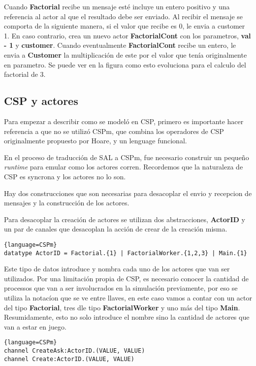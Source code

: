 \documentclass[fleqn]{article}
\begin{document}
Cuando \textbf{Factorial} recibe un mensaje esté incluye un entero positivo y
una referencia al actor al que el resultado debe ser enviado. Al recibir el
mensaje se comporta de la siguiente manera, si el valor que recibe es 0, le
envia a customer 1. En caso contrario, crea un nuevo actor
\textbf{FactorialCont} con los parametros, \textbf{val - 1} y \textbf{customer}.
Cuando eventualmente \textbf{FactorialCont} recibe un entero, le envia a
\textbf{Customer} la multiplicación de este por el valor que tenía originalmente
en parametro. Se puede ver en la figura como esto evoluciona para el calculo del
factorial de 3.

\subsection{CSP y actores}
Para empezar a describir como se modeló en CSP, primero es importante hacer
referencia a que no se utilizó CSPm, que combina los operadores de CSP
originalmente propuesto por Hoare, y un lenguage funcional.

En el proceso de traducción de SAL a CSPm, fue necesario construir un pequeño
\textit{runtime} para emular como los actores corren. Recordemos que la
naturaleza de CSP es syncrona y los actores no lo son.

Hay dos construcciones que son necesarias para desacoplar el envio y recepcion
de mensajes y la construcción de los actores.

Para desacoplar la creación de actores se utilizan dos abstracciones,
\textbf{ActorID} y un par de canales que desacoplan la acción de crear de la
creación misma.

\begin{lstlisting}{language=CSPm}
datatype ActorID = Factorial.{1} | FactorialWorker.{1,2,3} | Main.{1}
\end{lstlisting}

Este tipo de datos introduce y nombra cada uno de los actores que van ser
utilizados. Por una limitación propia de CSP, es necesario conocer la cantidad de processos
que van a ser involucrados en la simulación previamente, por eso se utiliza la
notacíon que se ve entre llaves, en este caso vamos a contar con un actor del
tipo \textbf{Factorial}, tres dle tipo \textbf{FactorialWorker} y uno más del
tipo \textbf{Main}. Resumidamente, esto no solo introduce el nombre sino la
cantidad de actores que van a estar en juego.

\begin{lstlisting}{language=CSPm}
channel CreateAsk:ActorID.(VALUE, VALUE)
channel Create:ActorID.(VALUE, VALUE)
\end{lstlisting}
\end{document}

